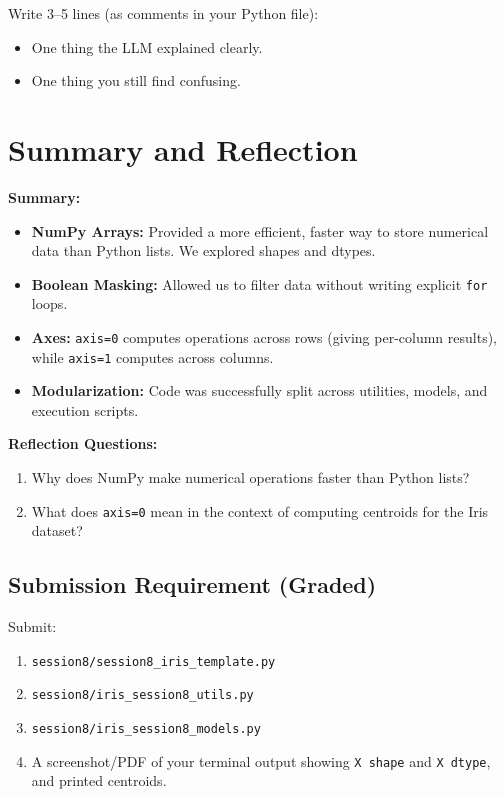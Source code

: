 \begin{tcolorbox}[title=Do: Reflection]
Write 3--5 lines (as comments in your Python file):
\begin{itemize}\setlength{\itemsep}{0pt}
\item One thing the LLM explained clearly.
\item One thing you still find confusing.
\end{itemize}
\end{tcolorbox}

\section{Summary and Reflection}

\textbf{Summary:}
\begin{itemize}
    \item \textbf{NumPy Arrays:} Provided a more efficient, faster way to store numerical data than Python lists. We explored shapes and dtypes.
    \item \textbf{Boolean Masking:} Allowed us to filter data without writing explicit \texttt{for} loops.
    \item \textbf{Axes:} \texttt{axis=0} computes operations across rows (giving per-column results), while \texttt{axis=1} computes across columns.
    \item \textbf{Modularization:} Code was successfully split across utilities, models, and execution scripts.
\end{itemize}

\textbf{Reflection Questions:}
\begin{enumerate}
    \item Why does NumPy make numerical operations faster than Python lists?
    \item What does \texttt{axis=0} mean in the context of computing centroids for the Iris dataset?
\end{enumerate}

\subsection{Submission Requirement (Graded)}

\noindent
Submit:
\begin{enumerate}
    \item \texttt{session8/session8\_iris\_template.py}
    \item \texttt{session8/iris\_session8\_utils.py}
    \item \texttt{session8/iris\_session8\_models.py}
    \item A screenshot/PDF of your terminal output showing \texttt{X shape} and \texttt{X dtype}, and printed centroids.
\end{enumerate}
